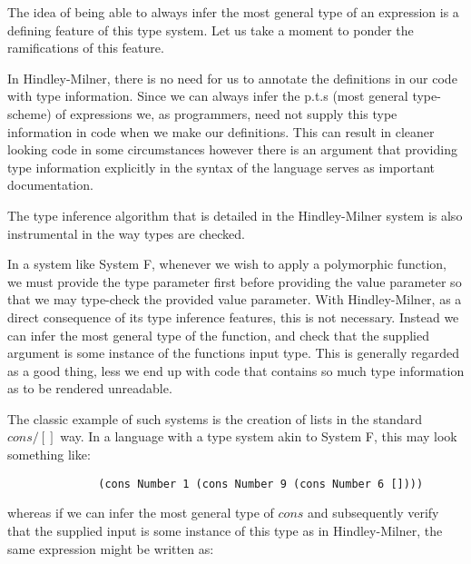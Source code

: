 \documentclass{ProgressReport}[2020/09/15]
\begin{document}
            The idea of being able to always infer the most general type of an
            expression is a defining feature of this type system. Let us take a
            moment to ponder the ramifications of this feature.
            
            In Hindley-Milner, there is no need for us to annotate the definitions
            in our code with type information. Since we can always
            infer the p.t.s (most general type-scheme) of expressions
            we, as programmers, need not supply this type information
            in code when we make our definitions. This can result in
            cleaner looking code in some circumstances however there
            is an argument that providing type information explicitly
            in the syntax of the language serves as important documentation.
                        
            The type inference algorithm that is detailed in the Hindley-Milner
            system is also instrumental in the way types are checked.
            
            In a system like System F, whenever we wish to apply a polymorphic
            function, we must provide the type parameter first before providing
            the value parameter so that we may type-check the provided value
            parameter. With Hindley-Milner, as a direct consequence of its type
            inference features, this is not necessary. Instead we can infer the
            most general type of the function, and check that the supplied
            argument is some instance of the functions input type. This is
            generally regarded as a good thing, less we end up with code that
            contains so much type information as to be rendered
            unreadable. \clearpage
            
            The classic example of such systems is the creation of lists in the
            standard $cons/[]$ way. In a language with a type system akin to
            System F, this may look
            something like:
            
            \begin{verbatim}
              (cons Number 1 (cons Number 9 (cons Number 6 [])))  
            \end{verbatim}
            
            whereas if we can infer the most general type of $cons$ and
            subsequently verify that the supplied input is some instance of this
            type as in Hindley-Milner, the same expression might be written as:
            
\end{document}
